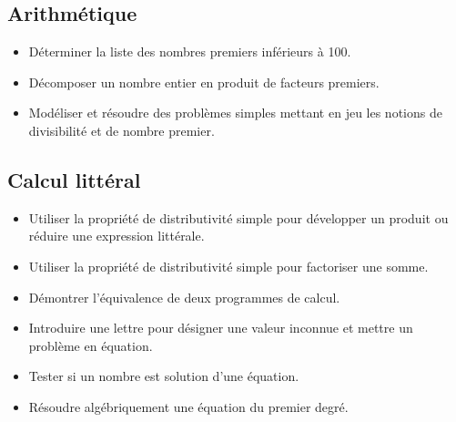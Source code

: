 \documentclass[a4paper,12pt,fleqn]{article}	
\begin{document}
\subsection*{Arithmétique}

\begin{itemize}
	\item {}Déterminer la liste des nombres premiers inférieurs à 100.
	\item {}Décomposer un nombre entier en produit de facteurs premiers.
	\item {}Modéliser et résoudre des problèmes simples mettant en jeu les notions de divisibilité et de nombre premier.
\end{itemize}

\subsection*{Calcul littéral}

\begin{itemize}
	\item {}Utiliser la propriété de distributivité simple pour développer un produit ou réduire une expression littérale.
	\item {}Utiliser la propriété de distributivité simple pour factoriser une somme.
	\item {}Démontrer l’équivalence de deux programmes de calcul.
	\item {}Introduire une lettre pour désigner une valeur inconnue et mettre un problème en équation.
	\item {}Tester si un nombre est solution d’une équation.
	\item {}Résoudre algébriquement une équation du premier degré.
\end{itemize}

	
\end{document}
